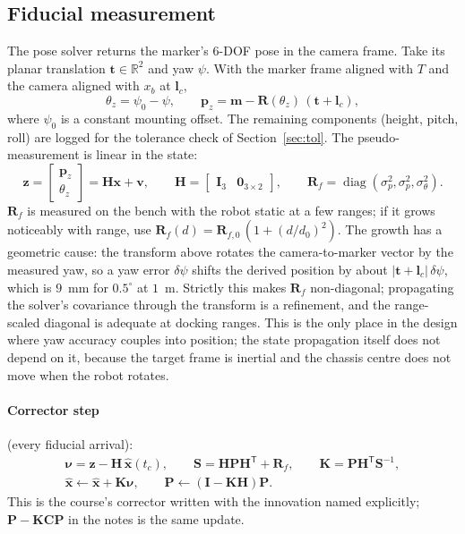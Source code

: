 \documentclass[11pt,a4paper]{article}
\newcommand{\vect}[1]{\bm{#1}}
\newcommand{\mat}[1]{\bm{#1}}
\newcommand{\T}{^{\mathsf{T}}}
\newcommand{\Real}{\mathbb{R}}
\newcommand{\diag}{\operatorname{diag}}
\newcommand{\Rot}{\mat{R}}
\newcommand{\hx}{\hat{\vect{x}}}
\begin{document}
\subsection{Fiducial measurement}
\label{sec:fid}
The pose solver returns the marker's 6-DOF pose in the camera frame. Take its planar translation $\vect t\in\Real^2$ and yaw $\psi$. With the marker frame aligned with $T$ and the camera aligned with $x_b$ at $\vect l_c$,
\begin{equation}
\theta_z = \psi_0 - \psi,
\qquad
\vect p_z = \vect m - \Rot(\theta_z)\,(\vect t + \vect l_c),
\end{equation}
where $\psi_0$ is a constant mounting offset. The remaining components (height, pitch, roll) are logged for the tolerance check of Section~\ref{sec:tol}. The pseudo-measurement is linear in the state:
\begin{equation}
\vect z = \begin{bmatrix}\vect p_z\\ \theta_z\end{bmatrix} = \mat H\vect x + \vect v,
\qquad
\mat H = \begin{bmatrix}\mat I_3 & \mat 0_{3\times 2}\end{bmatrix},
\qquad
\mat R_f = \diag(\sigma_p^2,\sigma_p^2,\sigma_\theta^2).
\label{eq:Hf}
\end{equation}
$\mat R_f$ is measured on the bench with the robot static at a few ranges; if it grows noticeably with range, use $\mat R_f(d)=\mat R_{f,0}\,(1+(d/d_0)^2)$. The growth has a geometric cause: the transform above rotates the camera-to-marker vector by the measured yaw, so a yaw error $\delta\psi$ shifts the derived position by about $|\vect t+\vect l_c|\,\delta\psi$, which is $9$~mm for $0.5^\circ$ at $1$~m. Strictly this makes $\mat R_f$ non-diagonal; propagating the solver's covariance through the transform is a refinement, and the range-scaled diagonal is adequate at docking ranges. This is the only place in the design where yaw accuracy couples into position; the state propagation itself does not depend on it, because the target frame is inertial and the chassis centre does not move when the robot rotates.

\paragraph{Corrector step} (every fiducial arrival):
\begin{gather}
\vect\nu = \vect z - \mat H\,\hx(t_c),\qquad
\mat S = \mat H\mat P\mat H\T + \mat R_f,\qquad
\mat K = \mat P\mat H\T\mat S^{-1},
\label{eq:corr}\\
\hx \leftarrow \hx + \mat K\vect\nu,\qquad
\mat P \leftarrow (\mat I-\mat K\mat H)\mat P.
\end{gather}
This is the course's corrector written with the innovation named explicitly; $\mat P-\mat K\mat C\mat P$ in the notes is the same update.
\end{document}
